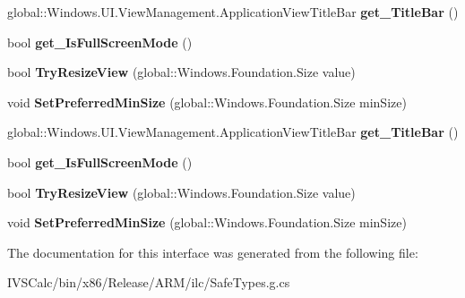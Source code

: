 \begin{DoxyCompactItemize}
\mbox{\label{interface_windows_1_1_u_i_1_1_view_management_1_1_i_application_view3_acc34a016b86b681c63d56374afcb3583}} 
global\+::\+Windows.\+U\+I.\+View\+Management.\+Application\+View\+Title\+Bar {\bfseries get\+\_\+\+Title\+Bar} ()
\item 
\mbox{\label{interface_windows_1_1_u_i_1_1_view_management_1_1_i_application_view3_a9812a28b2f40c23228f4696cd1042fe8}} 
bool {\bfseries get\+\_\+\+Is\+Full\+Screen\+Mode} ()
\item 
\mbox{\label{interface_windows_1_1_u_i_1_1_view_management_1_1_i_application_view3_a20cf9528ed2169b0c836294dd5750097}} 
bool {\bfseries Try\+Resize\+View} (global\+::\+Windows.\+Foundation.\+Size value)
\item 
\mbox{\label{interface_windows_1_1_u_i_1_1_view_management_1_1_i_application_view3_abb301c42e193451baed06bd07c92fc46}} 
void {\bfseries Set\+Preferred\+Min\+Size} (global\+::\+Windows.\+Foundation.\+Size min\+Size)
\item 
\mbox{\label{interface_windows_1_1_u_i_1_1_view_management_1_1_i_application_view3_acc34a016b86b681c63d56374afcb3583}} 
global\+::\+Windows.\+U\+I.\+View\+Management.\+Application\+View\+Title\+Bar {\bfseries get\+\_\+\+Title\+Bar} ()
\item 
\mbox{\label{interface_windows_1_1_u_i_1_1_view_management_1_1_i_application_view3_a9812a28b2f40c23228f4696cd1042fe8}} 
bool {\bfseries get\+\_\+\+Is\+Full\+Screen\+Mode} ()
\item 
\mbox{\label{interface_windows_1_1_u_i_1_1_view_management_1_1_i_application_view3_a20cf9528ed2169b0c836294dd5750097}} 
bool {\bfseries Try\+Resize\+View} (global\+::\+Windows.\+Foundation.\+Size value)
\item 
\mbox{\label{interface_windows_1_1_u_i_1_1_view_management_1_1_i_application_view3_abb301c42e193451baed06bd07c92fc46}} 
void {\bfseries Set\+Preferred\+Min\+Size} (global\+::\+Windows.\+Foundation.\+Size min\+Size)
\end{DoxyCompactItemize}


The documentation for this interface was generated from the following file\+:\begin{DoxyCompactItemize}
\item 
I\+V\+S\+Calc/bin/x86/\+Release/\+A\+R\+M/ilc/Safe\+Types.\+g.\+cs\end{DoxyCompactItemize}
